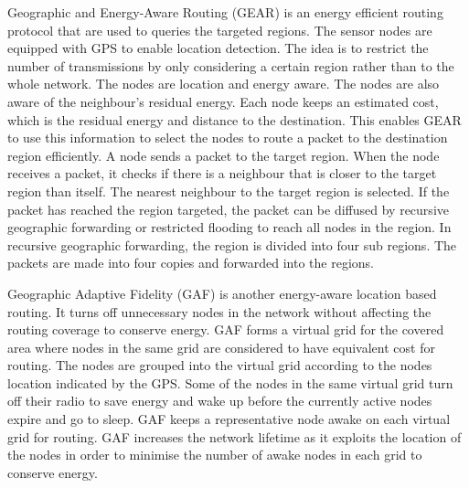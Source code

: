 Geographic and Energy-Aware Routing (GEAR) is an energy efficient routing protocol that are used to queries the targeted regions. The sensor nodes are equipped with GPS to enable location detection. The idea is to restrict the number of transmissions by only considering a certain region rather than to the whole network. The nodes are location and energy aware. The nodes are also aware of the neighbour's residual energy. Each node keeps an estimated cost, which is the residual energy and distance to the destination. This enables GEAR to use this information to select the nodes to route a packet to the destination region efficiently. A node sends a packet to the target region. When the node receives a packet, it checks if there is a neighbour that is closer to the target region than itself. The nearest neighbour to the target region is selected. If the packet has reached the region targeted, the packet can be diffused by recursive geographic forwarding or restricted flooding to reach all nodes in the region. In recursive geographic forwarding, the region is divided into four sub regions. The packets are made into four copies and forwarded into the regions.


Geographic Adaptive Fidelity (GAF) is another energy-aware location based routing. It turns off unnecessary nodes in the network without affecting the routing coverage to conserve energy. GAF forms a virtual grid for the covered area where nodes in the same grid are considered to have equivalent cost for routing. The nodes are grouped into the virtual grid according to the nodes location indicated by the GPS. Some of the nodes in the same virtual grid turn off their radio to save energy and wake up before the currently active nodes expire and go to sleep. GAF keeps a representative node awake on each virtual grid for routing. GAF increases the network lifetime as it exploits the location of the nodes in order to minimise the number of awake nodes in each grid to conserve energy. 

